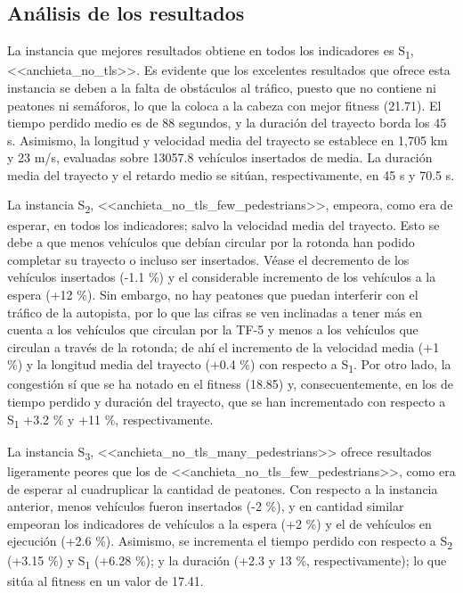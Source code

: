 \subsection{Análisis de los resultados}

La instancia que mejores resultados obtiene en todos los indicadores es S\textsubscript{1}, <<anchieta\_no\_tls>>. Es evidente que los excelentes resultados que ofrece esta instancia se deben a la falta de obstáculos al tráfico, puesto que no contiene ni peatones ni semáforos, lo que la coloca a la cabeza con mejor fitness (21.71). El tiempo perdido medio es de 88 segundos, y la duración del trayecto borda los 45 s. Asimismo, la longitud y velocidad media del trayecto se establece en 1,705 km y 23 m/s, evaluadas sobre 13057.8 vehículos insertados de media. La duración media del trayecto y el retardo medio se sitúan, respectivamente, en 45 s y 70.5 s.

La instancia S\textsubscript{2}, <<anchieta\_no\_tls\_few\_pedestrians>>, empeora, como era de esperar, en todos los indicadores; salvo la velocidad media del trayecto. Esto se debe a que menos vehículos que debían circular por la rotonda han podido completar su trayecto o incluso ser insertados. Véase el decremento de los vehículos insertados (-1.1 \%) y el considerable incremento de los vehículos a la espera (+12 \%). Sin embargo, no hay peatones que puedan interferir con el tráfico de la autopista, por lo que las cifras se ven inclinadas a tener más en cuenta a los vehículos que circulan por la TF-5 y menos a los vehículos que circulan a través de la rotonda; de ahí el incremento de la velocidad media (+1 \%) y la longitud media del trayecto (+0.4 \%) con respecto a S\textsubscript{1}. Por otro lado, la congestión sí que se ha notado en el fitness (18.85) y, consecuentemente, en los de tiempo perdido y duración del trayecto, que se han incrementado con respecto a S\textsubscript{1} +3.2 \% y +11 \%, respectivamente.

La instancia S\textsubscript{3}, <<anchieta\_no\_tls\_many\_pedestrians>> ofrece resultados ligeramente peores que los de <<anchieta\_no\_tls\_few\_pedestrians>>, como era de esperar al cuadruplicar la cantidad de peatones. Con respecto a la instancia anterior, menos vehículos fueron insertados (-2 \%), y en cantidad similar empeoran los indicadores de vehículos a la espera (+2 \%) y el de vehículos en ejecución (+2.6 \%). Asimismo, se incrementa el tiempo perdido con respecto a S\textsubscript{2} (+3.15 \%) y S\textsubscript{1} (+6.28 \%); y la duración (+2.3 y 13 \%, respectivamente); lo que sitúa al fitness en un valor de 17.41.

